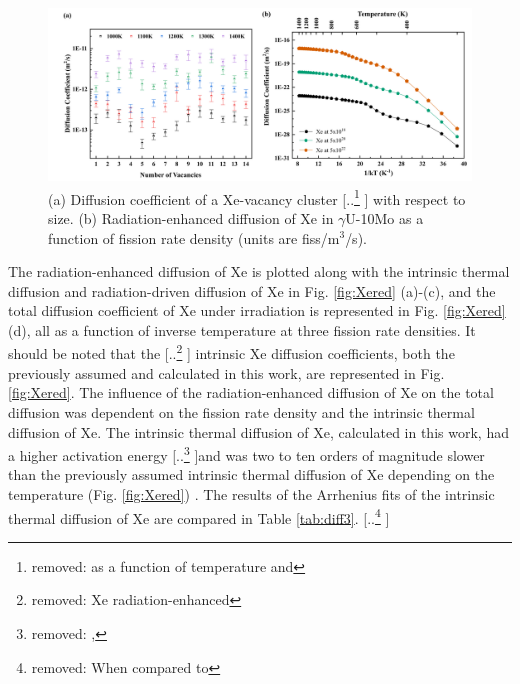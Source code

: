 \documentclass[preprint,12pt]{elsarticle}
\providecommand{\DIFadd}[1]{{\protect\color{blue} \sf #1}} %
\providecommand{\DIFdel}[1]{{\protect\color{red} [..\footnote{removed: #1} ]}} %
\providecommand{\DIFaddbegin}{} %
\providecommand{\DIFaddend}{} %
\providecommand{\DIFdelbegin}{} %
\providecommand{\DIFdelend}{} %
\providecommand{\DIFaddFL}[1]{\DIFadd{#1}} %
\providecommand{\DIFdelFL}[1]{\DIFdel{#1}} %
\providecommand{\DIFaddbeginFL}{} %
\providecommand{\DIFaddendFL}{} %
\providecommand{\DIFdelbeginFL}{} %
\providecommand{\DIFdelendFL}{} %
\newcommand{\DIFscaledelfig}{0.5}
\newlength{\DIFdelgraphicswidth} %
\newlength{\DIFdelgraphicsheight} %
\newcommand{\DIFaddincludegraphics}[2][]{{\color{blue}\fbox{\DIFOincludegraphics[#1]{#2}}}} %
\newcommand{\DIFdelincludegraphics}[2][]{%
\sbox{\DIFdelgraphicsbox}{\DIFOincludegraphics[#1]{#2}}%
\settoboxwidth{\DIFdelgraphicswidth}{\DIFdelgraphicsbox} %
\settoboxtotalheight{\DIFdelgraphicsheight}{\DIFdelgraphicsbox} %
\scalebox{\DIFscaledelfig}{%
\parbox[b]{\DIFdelgraphicswidth}{\usebox{\DIFdelgraphicsbox}\\[-\baselineskip] \rule{\DIFdelgraphicswidth}{0em}}\llap{\resizebox{\DIFdelgraphicswidth}{\DIFdelgraphicsheight}{%
\setlength{\unitlength}{\DIFdelgraphicswidth}%
\begin{picture}(1,1)%
\thicklines\linethickness{2pt} %
{\color[rgb]{1,0,0}\put(0,0){\framebox(1,1){}}}%
{\color[rgb]{1,0,0}\put(0,0){\line( 1,1){1}}}%
{\color[rgb]{1,0,0}\put(0,1){\line(1,-1){1}}}%
\end{picture}%
}\hspace*{3pt}}} %
} %
\DeclareRobustCommand{\DIFaddbegin}{\DIFOaddbegin \let\includegraphics\DIFaddincludegraphics} %
\DeclareRobustCommand{\DIFaddend}{\DIFOaddend \let\includegraphics\DIFOincludegraphics} %
\DeclareRobustCommand{\DIFdelbegin}{\DIFOdelbegin \let\includegraphics\DIFdelincludegraphics} %
\DeclareRobustCommand{\DIFdelend}{\DIFOaddend \let\includegraphics\DIFOincludegraphics} %
\DeclareRobustCommand{\DIFaddbeginFL}{\DIFOaddbeginFL \let\includegraphics\DIFaddincludegraphics} %
\DeclareRobustCommand{\DIFaddendFL}{\DIFOaddendFL \let\includegraphics\DIFOincludegraphics} %
\DeclareRobustCommand{\DIFdelbeginFL}{\DIFOdelbeginFL \let\includegraphics\DIFdelincludegraphics} %
\DeclareRobustCommand{\DIFdelendFL}{\DIFOaddendFL \let\includegraphics\DIFOincludegraphics} %
\begin{document}
\begin{figure}[hbt!]
\centering
\includegraphics[width=1\textwidth]{Fig9.png}
\caption{(a) Diffusion coefficient of a Xe-vacancy cluster \DIFdelbeginFL \DIFdelFL{as a function of temperature and }\DIFdelendFL \DIFaddbeginFL \DIFaddFL{with respect to }\DIFaddendFL size. (b) Radiation-enhanced diffusion of Xe in $\gamma$U-10Mo as a function of fission rate density (units are fiss/m$^{3}$/s). }
\label{fig:Xediff}
\end{figure}

\FloatBarrier


\indent The radiation-enhanced diffusion of Xe is plotted along with the intrinsic thermal diffusion and radiation-driven diffusion of Xe in Fig. \ref{fig:Xered} (a)-(c), and the total diffusion coefficient of Xe under irradiation is represented in Fig. \ref{fig:Xered}(d), all as a function of inverse temperature at three fission rate densities. It should be noted that the \DIFdelbegin \DIFdel{Xe radiation-enhanced }\DIFdelend \DIFaddbegin \DIFadd{intrinsic Xe }\DIFaddend diffusion coefficients, both the previously assumed \cite{hu2016microstructural, Beeler2018microstructural} and calculated in this work, are represented in Fig. \ref{fig:Xered}. The influence of the radiation-enhanced diffusion of Xe on the total diffusion was dependent on the fission rate density and the intrinsic thermal diffusion of Xe. The intrinsic thermal diffusion of Xe, calculated in this work, had a higher activation energy \DIFdelbegin \DIFdel{, }\DIFdelend and was two to ten orders of magnitude slower than the previously assumed intrinsic thermal diffusion of Xe depending on the temperature (Fig. \ref{fig:Xered}) \cite{hu2016microstructural, Beeler2018microstructural}. The results of the Arrhenius fits of the intrinsic thermal diffusion of Xe are compared in Table \ref{tab:diff3}. 
\DIFdelbegin \DIFdel{When compared to }\DIFdelend \DIFaddbegin 
\end{document}
